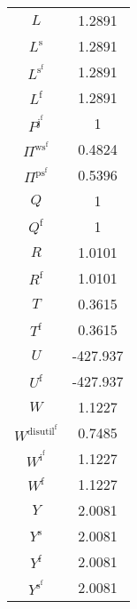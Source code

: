 \begin{tabular}{c|c|}
$L$ & 1.2891 \\
$L^{\mathrm{s}}$ & 1.2891 \\
$L^{\mathrm{s}^{\mathrm{f}}}$ & 1.2891 \\
$L^{\mathrm{f}}$ & 1.2891 \\
$P^{\mathrm{j}^{\mathrm{f}}}$ & 1 \\
$\Pi^{\mathrm{ws}^{\mathrm{f}}}$ & 0.4824 \\
$\Pi^{\mathrm{ps}^{\mathrm{f}}}$ & 0.5396 \\
$Q$ & 1 \\
$Q^{\mathrm{f}}$ & 1 \\
$R$ & 1.0101 \\
$R^{\mathrm{f}}$ & 1.0101 \\
$T$ & 0.3615 \\
$T^{\mathrm{f}}$ & 0.3615 \\
$U$ & -427.937 \\
$U^{\mathrm{f}}$ & -427.937 \\
$W$ & 1.1227 \\
$W^{\mathrm{disutil}^{\mathrm{f}}}$ & 0.7485 \\
$W^{\mathrm{i}^{\mathrm{f}}}$ & 1.1227 \\
$W^{\mathrm{f}}$ & 1.1227 \\
$Y$ & 2.0081 \\
$Y^{\mathrm{s}}$ & 2.0081 \\
$Y^{\mathrm{f}}$ & 2.0081 \\
$Y^{\mathrm{s}^{\mathrm{f}}}$ & 2.0081 \\
\hline
\end{tabular}


